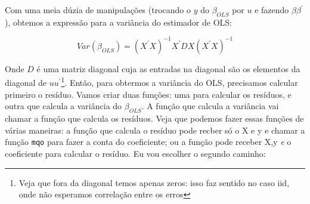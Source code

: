 \documentclass[]{book}
\newenvironment{Shaded}{\begin{snugshade}}{\end{snugshade}}
\newcommand{\KeywordTok}[1]{\textcolor[rgb]{0.13,0.29,0.53}{\textbf{#1}}}
\newcommand{\DataTypeTok}[1]{\textcolor[rgb]{0.13,0.29,0.53}{#1}}
\newcommand{\DecValTok}[1]{\textcolor[rgb]{0.00,0.00,0.81}{#1}}
\newcommand{\StringTok}[1]{\textcolor[rgb]{0.31,0.60,0.02}{#1}}
\newcommand{\CommentTok}[1]{\textcolor[rgb]{0.56,0.35,0.01}{\textit{#1}}}
\newcommand{\ControlFlowTok}[1]{\textcolor[rgb]{0.13,0.29,0.53}{\textbf{#1}}}
\newcommand{\OperatorTok}[1]{\textcolor[rgb]{0.81,0.36,0.00}{\textbf{#1}}}
\newcommand{\NormalTok}[1]{#1}
\let\rmarkdownfootnote\footnote%
\def\footnote{\protect\rmarkdownfootnote}
\begin{document}
Com uma meia dúzia de manipulações (trocando o \(y\) do \(\beta_{OLS}\)
por \(u\) e fazendo \(\beta \beta^{'}\)), obtemos a expressão para a
variância do estimador de OLS:

\[Var(\beta_{OLS}) = (X^{'}X)^{-1}X^{'}DX(X^{'}X)^{-1}\]

Onde \(D\) é uma matriz diagonal cuja as entradas na diagonal são os
elementos da diagonal de \(uu^{'}\)\footnote{Veja que fora da diagonal
  temos apenas zeros: isso faz sentido no caso iid, onde não esperamos
  correlação entre os erros}. Então, para obtermos a variância do OLS,
precisamos calcular primeiro o resíduo. Vamos criar duas funções: uma
para calcular os resíduos, e outra que calcula a variância do
\(\beta_{OLS}\). A função que calcula a variância vai chamar a função
que calcula os resíduos. Veja que podemos fazer essas funções de várias
maneiras: a função que calcula o resíduo pode recber só o X e y e chamar
a função \texttt{mqo} para fazer a conta do coeficiente; ou a função
pode receber X,y \emph{e} o coeficiente para calcular o resíduo. Eu vou
escolher o segundo caminho:

\begin{Shaded}
\end{Shaded}
\end{document}
